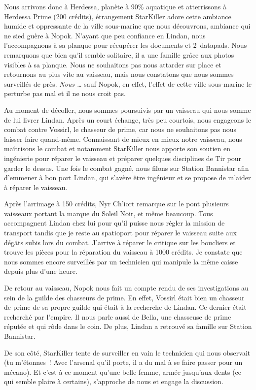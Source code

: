 \documentclass[a4paper,9pt,twoside,twocolumn,openany]{book}
\begin{document}
Nous arrivons donc à Herdessa, planète à 90\% aquatique et atterrissons à Herdessa Prime (200 crédits), étrangement StarKiller adore cette ambiance humide et oppressante de la ville sous-marine que nous découvrons, ambiance qui ne sied guère à Nopok. N'ayant que peu confiance en Lindan, nous l'accompagnons à sa planque pour récupérer les documents et 2\ datapads. Nous remarquons que bien qu'il semble solitaire, il a une famille grâce aux photos visibles à sa planque. Nous ne souhaitons pas nous attarder sur place et retournons au plus vite au vaisseau, mais nous constatons que nous sommes surveillés de près. \emph{Nous …} sauf Nopok, en effet, l'effet de cette ville sous-marine le perturbe pas mal et il ne nous croit pas.

Au moment de décoller, nous sommes poursuivis par un vaisseau qui nous somme de lui livrer Lindan. Après un court échange, très peu courtois, nous engageons le combat contre Vossirl, le chasseur de prime, car nous ne souhaitons pas nous laisser faire quand-même. Connaissant de mieux en mieux notre vaisseau, nous maîtrisons le combat et notamment StarKiller nous apporte son soutien en ingénierie pour réparer le vaisseau et préparer quelques disciplines de Tir pour garder le dessus. Une fois le combat gagné, nous filons sur Station Bannistar afin d’emmener à bon port Lindan, qui s’avère être ingénieur et se propose de m’aider à réparer le vaisseau.

Après l'arrimage à 150 crédits, Nyr Ch'iort remarque sur le pont plusieurs vaisseaux portant la marque du Soleil Noir, et même beaucoup. Tous accompagnent Lindan chez lui pour qu’il puisse nous régler la mission de transport tandis que je reste au spatioport pour réparer le vaisseau suite aux dégâts subis lors du combat. J’arrive à réparer le critique sur les boucliers et trouve les pièces pour la réparation du vaisseau à 1000 crédits. Je constate que nous sommes encore surveillés par un technicien qui manipule la même caisse depuis plus d’une heure.

De retour au vaisseau, Nopok nous fait un compte rendu de ses investigations au sein de la guilde des chasseurs de prime. En effet, Vossirl était bien un chasseur de prime de sa propre guilde qui était à la recherche de Lindan. Ce dernier était recherché par l’empire. Il nous parle aussi de Bella, une chasseuse de prime réputée et qui rôde dans le coin. De plus, Lindan a retrouvé sa famille sur Station Bannistar.

De son côté, StarKiller tente de surveiller en vain le technicien qui nous observait (tu m’étonnes\ ! Avec l’arsenal qu’il porte, il a du mal à se faire passer pour un mécano). Et c’est à ce moment qu’une belle femme, armée jusqu’aux dents (ce qui semble plaire à certains), s’approche de nous et engage la discussion.
\end{document}
